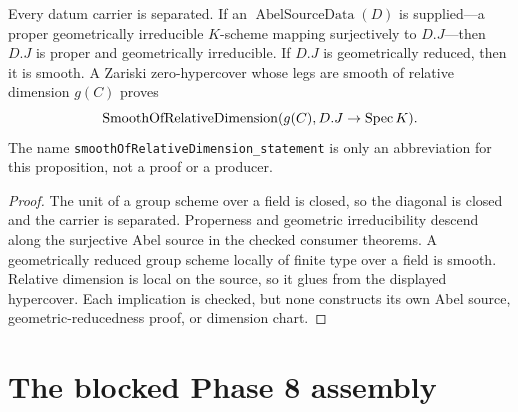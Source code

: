 \begin{theorem}
  \label{route-thm-datum-geometric-consumers}
  \leanok

  Every datum carrier is separated.  If an
  \(\operatorname{AbelSourceData}(D)\) is supplied---a proper geometrically
  irreducible \(K\)-scheme mapping surjectively to \(D.J\)---then \(D.J\) is
  proper and geometrically irreducible.  If \(D.J\) is geometrically reduced,
  then it is smooth.  A Zariski zero-hypercover whose legs are smooth of
  relative dimension \(g(C)\) proves
  \[
    \operatorname{SmoothOfRelativeDimension}(g(C),D.J\to\operatorname{Spec} K).
  \]
  The name \texttt{smoothOfRelativeDimension\_statement} is only an
  abbreviation for this proposition, not a proof or a producer.
\end{theorem}

\begin{proof}
  The unit of a group scheme over a field is closed, so the diagonal is closed
  and the carrier is separated.  Properness and geometric irreducibility
  descend along the surjective Abel source in the checked consumer theorems.
  A geometrically reduced group scheme locally of finite type over a field is
  smooth.  Relative dimension is local on the source, so it glues from the
  displayed hypercover.  Each implication is checked, but none constructs its
  own Abel source, geometric-reducedness proof, or dimension chart.
\end{proof}

\section{The blocked Phase 8 assembly}

